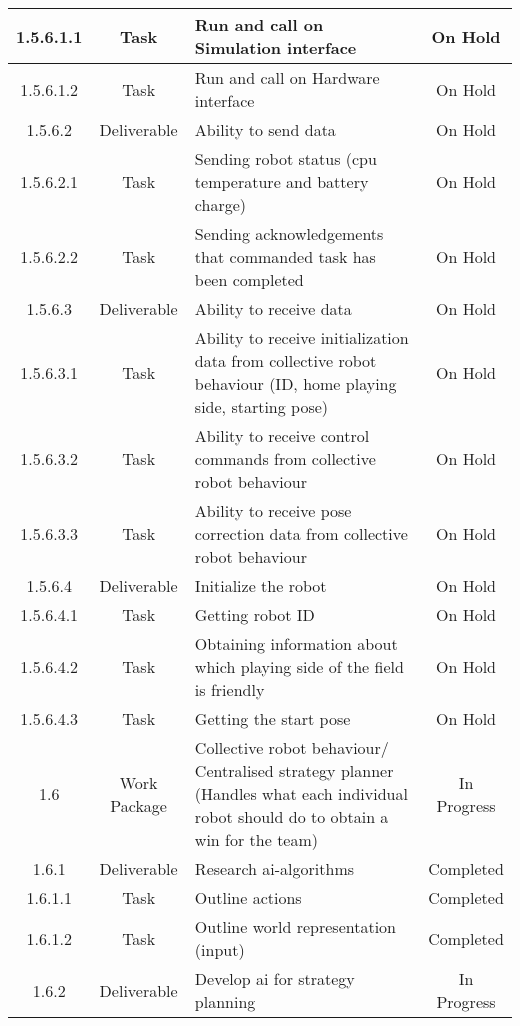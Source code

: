 \begin{longtable}{|c|c|m{}|c|}
    \rowcolor{h} 1.5.6.1.1 & Task & Run and call on Simulation interface & On Hold \\ \hline
    \rowcolor{h} 1.5.6.1.2 & Task & Run and call on Hardware interface & On Hold \\ \hline
    \rowcolor{h} 1.5.6.2 & Deliverable & Ability to send data & On Hold \\ \hline
    \rowcolor{h} 1.5.6.2.1 & Task & Sending robot status (\acs{cpu} temperature and battery charge) & On Hold \\ \hline
    \rowcolor{h} 1.5.6.2.2 & Task & Sending acknowledgements that commanded task has been completed & On Hold \\ \hline
    \rowcolor{h} 1.5.6.3 & Deliverable & Ability to receive data & On Hold \\ \hline
    \rowcolor{h} 1.5.6.3.1 & Task & Ability to receive initialization data from collective robot behaviour (ID, home playing side, starting pose) & On Hold \\ \hline
    \rowcolor{h}1.5.6.3.2 & Task & Ability to receive control commands from collective robot behaviour & On Hold \\ \hline
    \rowcolor{h} 1.5.6.3.3 & Task & Ability to receive pose correction data from collective robot behaviour & On Hold \\ \hline
    \rowcolor{h} 1.5.6.4 & Deliverable & Initialize the robot & On Hold \\ \hline
    \rowcolor{h} 1.5.6.4.1 & Task & Getting robot ID & On Hold \\ \hline
    \rowcolor{h} 1.5.6.4.2 & Task & Obtaining information about which playing side of the field is friendly & On Hold \\ \hline
    \rowcolor{h} 1.5.6.4.3 & Task & Getting the start pose & On Hold \\ \hline
    \rowcolor{p} 1.6 & Work Package & Collective robot behaviour/ Centralised strategy planner (Handles what each individual robot should do to obtain a win for the team) & In Progress \\ \hline
    \rowcolor{d} 1.6.1 & Deliverable & Research \acs{ai}-algorithms & Completed \\ \hline
    \rowcolor{d} 1.6.1.1 & Task & Outline actions & Completed \\ \hline
    \rowcolor{d} 1.6.1.2 & Task & Outline world representation (input) & Completed \\ \hline
    \rowcolor{p} 1.6.2 & Deliverable & Develop \acs{ai} for strategy planning & In Progress \\ \hline

\end{longtable}
